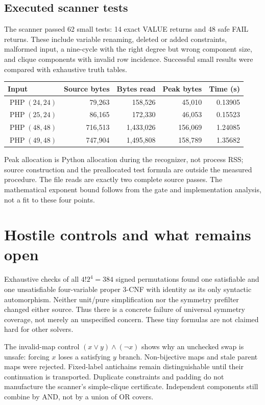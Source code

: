 \documentclass[11pt]{article}
\newcommand{\PHP}{\operatorname{PHP}}
\begin{document}
\subsection{Executed scanner tests}
The scanner passed 62 small tests: 14 exact VALUE returns and 48 safe FAIL returns. These include variable renaming, deleted or added constraints, malformed input, a nine-cycle with the right degree but wrong component size, and clique components with invalid row incidence. Successful small results were compared with exhaustive truth tables.

\begin{center}\small
\begin{tabular}{lrrrr}
\toprule
Input & Source bytes & Bytes read & Peak bytes & Time (s) \\
\midrule
$\PHP(24,24)$ & 79,263 & 158,526 & 45,010 & 0.13905 \\
$\PHP(25,24)$ & 86,165 & 172,330 & 46,053 & 0.15523 \\
$\PHP(48,48)$ & 716,513 & 1,433,026 & 156,069 & 1.24085 \\
$\PHP(49,48)$ & 747,904 & 1,495,808 & 158,789 & 1.35682 \\
\bottomrule
\end{tabular}
\end{center}

Peak allocation is Python allocation during the recognizer, not process RSS; source construction and the preallocated test formula are outside the measured procedure. The file reads are exactly two complete source passes. The mathematical exponent bound follows from the gate and implementation analysis, not a fit to these four points.

\section{Hostile controls and what remains open}
Exhaustive checks of all $4!2^4=384$ signed permutations found one satisfiable and one unsatisfiable four-variable proper 3-CNF with identity as its only syntactic automorphism. Neither unit/pure simplification nor the symmetry prefilter changed either source. Thus there is a concrete failure of universal symmetry coverage, not merely an unspecified concern. These tiny formulas are not claimed hard for other solvers.

The invalid-map control $(x\vee y)\wedge(\neg x)$ shows why an unchecked swap is unsafe: forcing $x$ loses a satisfying $y$ branch. Non-bijective maps and stale parent maps were rejected. Fixed-label antichains remain distinguishable until their continuation is transported. Duplicate constraints and padding do not manufacture the scanner's simple-clique certificate. Independent components still combine by AND, not by a union of OR covers.
\end{document}
